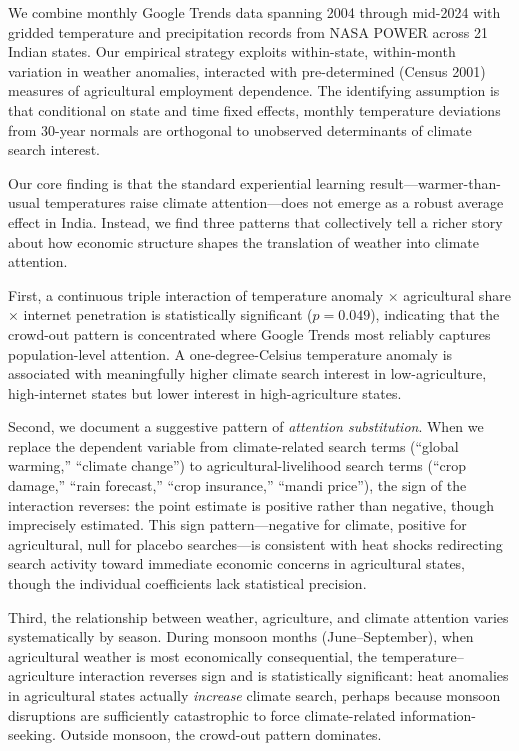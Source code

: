 \documentclass[12pt]{article}
\begin{document}
We combine monthly Google Trends data spanning 2004 through mid-2024 with gridded temperature and precipitation records from NASA POWER across 21 Indian states. Our empirical strategy exploits within-state, within-month variation in weather anomalies, interacted with pre-determined (Census 2001) measures of agricultural employment dependence. The identifying assumption is that conditional on state and time fixed effects, monthly temperature deviations from 30-year normals are orthogonal to unobserved determinants of climate search interest.

Our core finding is that the standard experiential learning result---warmer-than-usual temperatures raise climate attention---does not emerge as a robust average effect in India. Instead, we find three patterns that collectively tell a richer story about how economic structure shapes the translation of weather into climate attention.

First, a continuous triple interaction of temperature anomaly $\times$ agricultural share $\times$ internet penetration is statistically significant ($p = 0.049$), indicating that the crowd-out pattern is concentrated where Google Trends most reliably captures population-level attention. A one-degree-Celsius temperature anomaly is associated with meaningfully higher climate search interest in low-agriculture, high-internet states but lower interest in high-agriculture states.

Second, we document a suggestive pattern of \textit{attention substitution}. When we replace the dependent variable from climate-related search terms (``global warming,'' ``climate change'') to agricultural-livelihood search terms (``crop damage,'' ``rain forecast,'' ``crop insurance,'' ``mandi price''), the sign of the interaction reverses: the point estimate is positive rather than negative, though imprecisely estimated. This sign pattern---negative for climate, positive for agricultural, null for placebo searches---is consistent with heat shocks redirecting search activity toward immediate economic concerns in agricultural states, though the individual coefficients lack statistical precision.

Third, the relationship between weather, agriculture, and climate attention varies systematically by season. During monsoon months (June--September), when agricultural weather is most economically consequential, the temperature--agriculture interaction reverses sign and is statistically significant: heat anomalies in agricultural states actually \textit{increase} climate search, perhaps because monsoon disruptions are sufficiently catastrophic to force climate-related information-seeking. Outside monsoon, the crowd-out pattern dominates.
\end{document}
